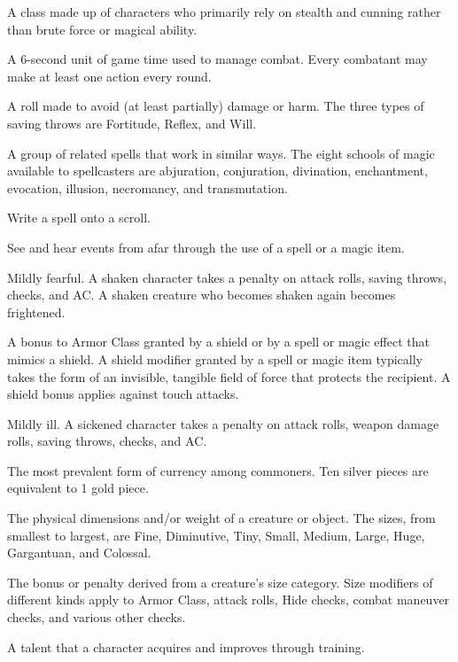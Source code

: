  A class made up of characters who primarily rely on 
stealth and cunning rather than brute force or magical ability. 

 A 6-second unit of game time used to manage combat. 
Every combatant may make at least one action every round. 

 A roll made to avoid (at least partially) 
damage or harm. The three types of saving throws are Fortitude, 
Reflex, and Will. 

 A group of related spells that work in similar 
ways. The eight schools of magic available to spellcasters are 
abjuration, conjuration, divination, enchantment, evocation, 
illusion, necromancy, and transmutation. 

 Write a spell onto a scroll. 

 See and hear events from afar through the use of a spell or a 
magic item. 

 Mildly fearful. A shaken character takes a  penalty on 
attack rolls, saving throws, checks, and AC. A shaken creature who becomes shaken again becomes frightened.

  A bonus to Armor Class granted by a shield or by a 
spell or magic effect that mimics a shield. A 
shield modifier granted by a spell or magic item typically takes the 
form of an invisible, tangible field of force that protects the 
recipient. A shield bonus applies against touch attacks. 

 Mildly ill. A sickened character takes a  penalty on attack rolls, weapon damage rolls, saving throws, checks, and AC.

 The most prevalent form of currency among 
commoners. Ten silver pieces are equivalent to 1 gold piece. 

 The physical dimensions and/or weight of a creature or 
object. The sizes, from smallest to largest, are Fine, Diminutive, 
Tiny, Small, Medium, Large, Huge, Gargantuan, and Colossal. 

 The bonus or penalty derived from a creature's 
size category. Size modifiers of different kinds apply to Armor Class, 
attack rolls, Hide checks, combat maneuver checks, and various other checks. 

 A talent that a character acquires and improves through 
training. 

